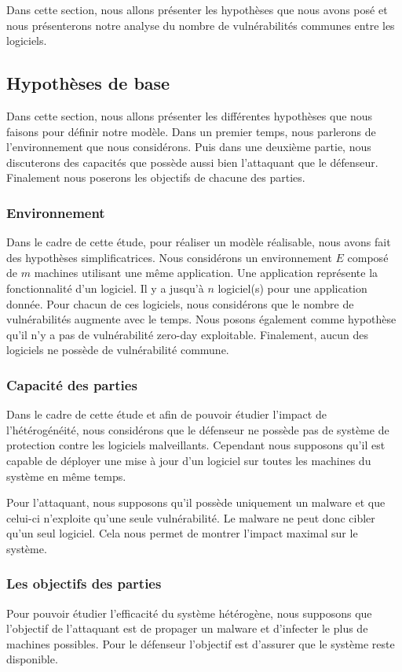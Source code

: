 Dans cette section, nous allons présenter les hypothèses que nous avons posé et nous présenterons notre analyse du nombre de vulnérabilités communes entre les logiciels.

\subsection{Hypothèses de base}\label{sec:hypothese}
Dans cette section, nous allons présenter les différentes hypothèses que nous faisons pour définir notre modèle.
Dans un premier temps, nous parlerons de l'environnement que nous considérons.
Puis dans une deuxième partie, nous discuterons des capacités que possède aussi bien l'attaquant que le défenseur.
Finalement nous poserons les objectifs de chacune des parties.

\subsubsection{Environnement}\label{sec:hypothese:env}
Dans le cadre de cette étude, pour réaliser un modèle réalisable, nous avons fait des hypothèses simplificatrices. Nous considérons un environnement $E$ composé de $m$ machines utilisant une même application.
Une application représente la fonctionnalité d'un logiciel.
Il y a jusqu'à $n$ logiciel(s) pour une application donnée.
Pour chacun de ces logiciels, nous considérons que le nombre de vulnérabilités augmente avec le temps.
Nous posons également comme hypothèse qu'il n'y a pas de vulnérabilité zero-day exploitable.
Finalement, aucun des logiciels ne possède de vulnérabilité commune.


\subsubsection{Capacité des parties}\label{sec:hypothese:capacite}
Dans le cadre de cette étude et afin de pouvoir étudier l'impact de l'hétérogénéité,  nous considérons que le défenseur ne possède pas de système de protection contre les logiciels malveillants.
Cependant nous supposons qu'il est capable de déployer une mise à jour d'un logiciel sur toutes les machines du système en même temps.

Pour l'attaquant, nous supposons qu'il possède uniquement un malware et que celui-ci n'exploite qu'une seule vulnérabilité.
Le malware ne peut donc cibler qu'un seul logiciel.
Cela nous permet de montrer l'impact maximal sur le système.


\subsubsection{Les objectifs des parties}\label{sec:hypothese:objectifs}
Pour pouvoir étudier l'efficacité du système hétérogène, nous supposons que l'objectif de l'attaquant est de propager un malware et d'infecter le plus de machines possibles.
Pour le défenseur l'objectif est d'assurer que le système reste disponible.


